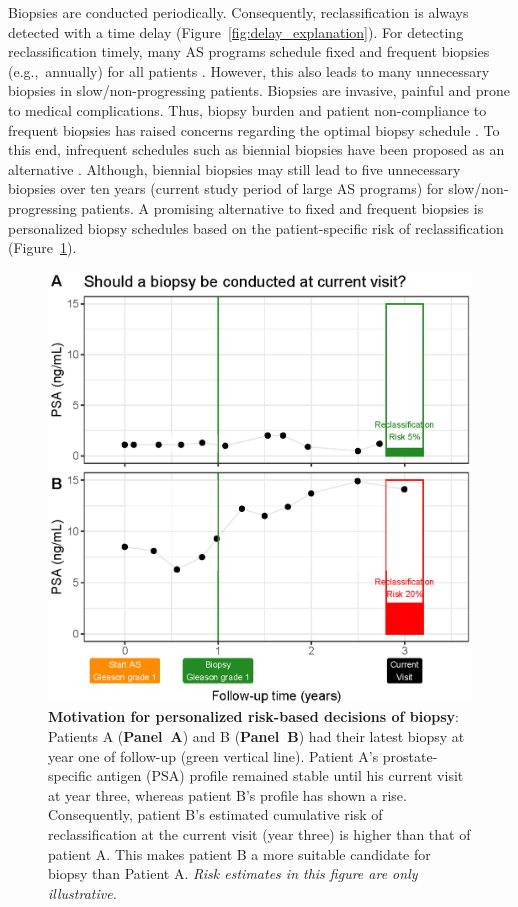 Biopsies are conducted periodically. Consequently, reclassification is always detected with a time delay (Figure~\ref{fig:delay_explanation}). For detecting reclassification timely, many AS programs schedule fixed and frequent biopsies (e.g.,~annually) for all patients \citep{nieboer2018active,loeb2014heterogeneity}. However, this also leads to many unnecessary biopsies in slow/non-progressing patients. Biopsies are invasive, painful and prone to medical complications. Thus, biopsy burden and patient non-compliance to frequent biopsies \citep{bokhorst2015compliance} has raised concerns regarding the optimal biopsy schedule \citep{inoue2018comparative, bratt2013study}. To this end, infrequent schedules such as biennial biopsies have been proposed as an alternative \citep{inoue2018comparative,de2017estimating}. Although, biennial biopsies may still lead to five unnecessary biopsies over ten years (current study period of large AS programs) for slow/non-progressing patients. A promising alternative to fixed and frequent biopsies is personalized biopsy schedules based on the patient-specific risk of reclassification (Figure~\ref{fig:riskBasedExample}).

\begin{figure}
\centerline{\includegraphics[width=\columnwidth]{images/riskBasedExample.eps}}
\caption{\textbf{Motivation for personalized risk-based decisions of biopsy}: Patients A (\textbf{Panel~A}) and B (\textbf{Panel~B}) had their latest biopsy at year one of follow-up (green vertical line). Patient A's prostate-specific antigen (PSA) profile remained stable until his current visit at year three, whereas patient B's profile has shown a rise. Consequently, patient B's estimated cumulative risk of reclassification at the current visit (year three) is higher than that of patient A. This makes patient B a more suitable candidate for biopsy than Patient A. \textit{Risk estimates in this figure are only illustrative.}}
\label{fig:riskBasedExample}
\end{figure}

